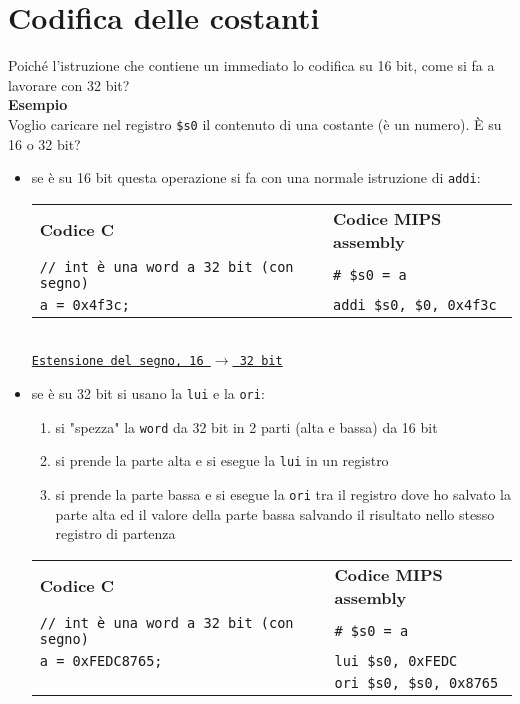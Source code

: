 \documentclass[../main.tex]{subfiles}
\begin{document}
\section{Codifica delle costanti}
Poiché l'istruzione che contiene un immediato lo codifica
su 16 bit, come si fa a lavorare con 32 bit?
\\[2mm]
\textbf{Esempio} \\
Voglio caricare nel registro \texttt{\$s0} il contenuto di una costante
(è un numero). È su 16 o 32 bit?
\\[1mm]
\begin{itemize}
    \vspace*{-3mm}
    \item se è su 16 bit questa operazione si fa con una normale istruzione
    di \texttt{addi}:
    \\[1mm]
    \begin{tabular}{ p{9cm} p{7cm} }
        \textbf{Codice C} & \textbf{Codice MIPS assembly} \\
        \texttt{// int è una word a 32 bit (con segno)} & \texttt{\# \$s0 = a} \\
        \texttt{a = 0x4f3c;} & \texttt{addi \$s0, \$0, 0x4f3c} \\
    \end{tabular}
    \\[1mm]
    \underline{\texttt{Estensione del segno, 16 $\rightarrow$ 32 bit}}
    \vspace*{3mm}
    \item se è su 32 bit si usano la \texttt{lui} e la \texttt{ori}:
    \begin{enumerate}
        \item si "spezza" la \texttt{word} da 32 bit in 2 parti (alta
        e bassa) da 16 bit
        \item si prende la parte alta e si esegue la \texttt{lui}
        in un registro
        \item si prende la parte bassa e si esegue la \texttt{ori}
        tra il registro dove ho salvato la parte alta ed il valore della
        parte bassa salvando il risultato nello stesso registro di partenza
    \end{enumerate}
    \vspace*{1mm}
    \begin{tabular}{ p{9cm} p{7cm} }
        \textbf{Codice C} & \textbf{Codice MIPS assembly} \\
        \texttt{// int è una word a 32 bit (con segno)} & \texttt{\# \$s0 = a} \\
        \texttt{a = 0xFEDC8765;} & \texttt{lui \$s0, 0xFEDC} \\
        & \texttt{ori \$s0, \$s0, 0x8765} \\
    \end{tabular}
\end{itemize}
\end{document}

